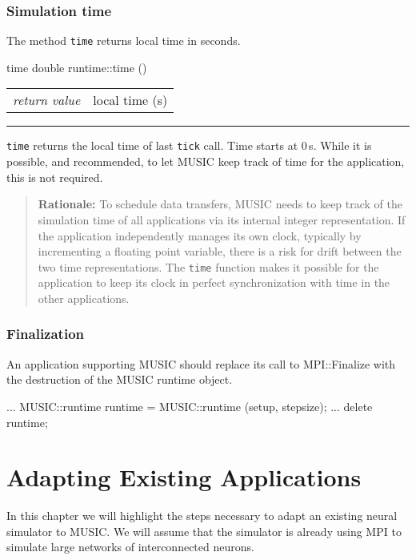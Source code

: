 \documentclass[a4paper,twoside]{report}
\makeatletter
\newenvironment{rationale}%
{\par\begin{quote}\textbf{Rationale:}}%
{\par\end{quote}}
\newenvironment{parameters}%
{\begin{tabular}{@{\hspace{2em}}lp{0.6\textwidth}}}%
{\end{tabular}\par\vspace{1mm}\par\hrule\par\vspace{5mm}}
\makeatother
\begin{document}
\subsection{Simulation time}

The method \lstinline|time| returns local time in seconds.

\begin{head}{time}
  double runtime::time ()
\end{head}
\begin{parameters}
  \emph{return value} & local time (s) \\
\end{parameters}

\lstinline|time| returns the local time of last \lstinline|tick|
call.  Time starts at 0\,s.  While it is possible, and recommended, to
let MUSIC keep track of time for the application, this is not
required.

\begin{rationale}
  To schedule data transfers, MUSIC needs to keep track of the
  simulation time of all applications via its internal integer
  representation.  If the application independently manages its own
  clock, typically by incrementing a floating point variable, there is
  a risk for drift between the two time representations.  The
  \lstinline|time| function makes it possible for the application to
  keep its clock in perfect synchronization with time in the other
  applications.
\end{rationale}


\subsection{Finalization}

An application supporting MUSIC should replace its call to
MPI::Finalize with the destruction of the MUSIC runtime object.

\begin{code}{}
  ...
  MUSIC::runtime runtime = MUSIC::runtime (setup, stepsize);
  ...
  delete runtime;
\end{code}

\chapter{Adapting Existing Applications}

In this chapter we will highlight the steps necessary to adapt an
existing neural simulator to MUSIC.  We will assume that the simulator
is already using MPI to simulate large networks of interconnected
neurons.
\end{document}
